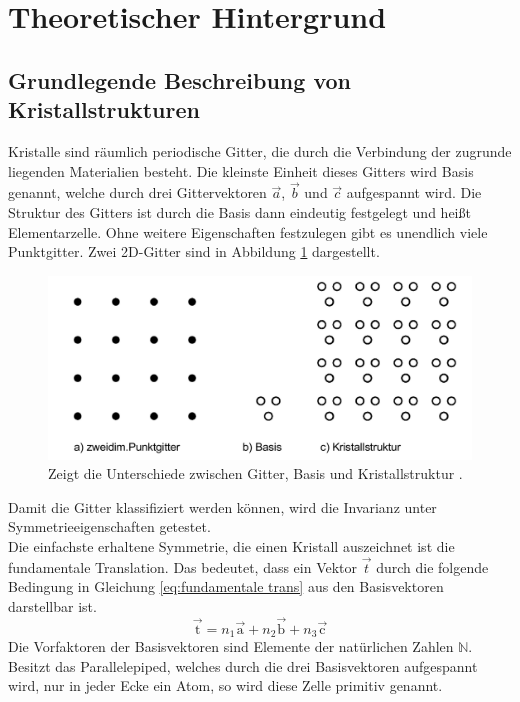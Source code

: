 ﻿\section{Theoretischer Hintergrund}
\label{sec:Theorie}
\subsection{Grundlegende Beschreibung von Kristallstrukturen}
Kristalle sind räumlich periodische Gitter, die durch die Verbindung der zugrunde liegenden Materialien besteht. 
Die kleinste Einheit dieses Gitters wird Basis genannt, welche durch drei Gittervektoren $\vec{a}$, $\vec{b}$ und $\vec{c}$ aufgespannt wird.
Die Struktur des Gitters ist durch die Basis dann eindeutig festgelegt und heißt Elementarzelle.
Ohne weitere Eigenschaften festzulegen gibt es unendlich viele Punktgitter.
Zwei 2D-Gitter sind in Abbildung \ref{fig:2dgitter} dargestellt.
\begin{figure}
	\centering
	\includegraphics[width = \textwidth]{Abbildungen/2dgitter.png}
	\caption{Zeigt die Unterschiede zwischen Gitter, Basis und Kristallstruktur \cite{Anleitung}.}
	\label{fig:2dgitter}
\end{figure} 
Damit die Gitter klassifiziert werden können, wird die Invarianz unter Symmetrieeigenschaften getestet. \\
Die einfachste erhaltene Symmetrie, die einen Kristall auszeichnet ist die fundamentale Translation. Das bedeutet, dass ein Vektor $\vec{t}$ durch die folgende Bedingung in Gleichung \ref{eq:fundamentale trans} aus den Basisvektoren darstellbar ist.
\begin{equation}
\vec{\text{t}} = n_1 \vec{\text{a}}+n_2 \vec{\text{b}}+n_3 \vec{\text{c}}
\label{eq:fundamentale trans}
\end{equation}
Die Vorfaktoren der Basisvektoren sind Elemente der natürlichen Zahlen $\mathbb{N}$.
Besitzt das Parallelepiped, welches durch die drei Basisvektoren aufgespannt wird, nur in jeder Ecke ein Atom, so wird diese Zelle primitiv genannt.
